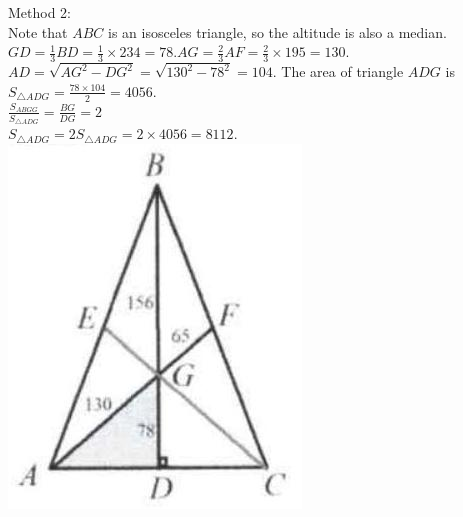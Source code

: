 \documentclass[10pt]{article}
\begin{document}
Method 2:\\
Note that \(A B C\) is an isosceles triangle, so the altitude is also a median.\\
\(G D=\frac{1}{3} B D=\frac{1}{3} \times 234=78 . A G=\frac{2}{3} A F=\frac{2}{3} \times 195=130\).\\
\(A D=\sqrt{A G^{2}-D G^{2}}=\sqrt{130^{2}-78^{2}}=104\). The area of triangle \(A D G\) is \(S_{\triangle A D G}=\frac{78 \times 104}{2}=4056\).\\
\(\frac{S_{A B G G}}{S_{\triangle A D G}}=\frac{B G}{D G}=2\)\\
\(S_{\triangle A D G}=2 S_{\triangle A D G}=2 \times 4056=8112\).\\
\includegraphics[max width=\textwidth, center]{2025_04_17_97bc1f7e44d93c271a88g-018(4)}
\end{document}
